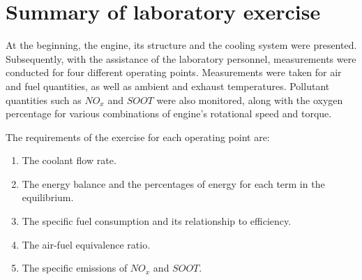 \documentclass{report}
\begin{document}
\section{%
Summary of laboratory exercise}
At the beginning, the engine, its structure and the cooling system were presented. Subsequently, with the assistance of the laboratory personnel, measurements were conducted for four different operating points. Measurements were taken for air and fuel quantities, as well as ambient and exhaust temperatures. Pollutant quantities such as $NO_x$ and $SOOT$ were also monitored, along with the oxygen percentage for various combinations of engine's rotational speed and torque.




The requirements of the exercise for each operating point are:


\begin{enumerate}

    \item The coolant flow rate.
    \item The energy balance and the percentages of energy for each term in the equilibrium.
    \item The specific fuel consumption and its relationship to efficiency.
    \item The air-fuel equivalence ratio.
    \item The specific emissions of $NO_x$ and $SOOT$.
\end{enumerate}
\end{document}
